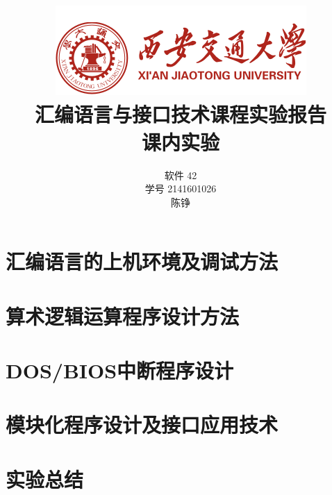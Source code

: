 \documentclass{ctexrep}
\title{\includegraphics[]{logo.png}\\汇编语言与接口技术课程实验报告 \\ 课内实验}
\author{软件 42 \\ 学号 2141601026 \\ 陈铮}
\newcommand \blankpage{
    \null
    \thispagestyle{empty}
    \addtocounter{page}{-1}
    \newpage
}
\begin{document}
\maketitle

\afterpage{\blankpage}

\tableofcontents

\chapter{汇编语言的上机环境及调试方法}


\chapter{算术逻辑运算程序设计方法}


\chapter{DOS/BIOS中断程序设计}


\chapter{模块化程序设计及接口应用技术}


\chapter{实验总结}


\lstlistoflistings
\end{document}
